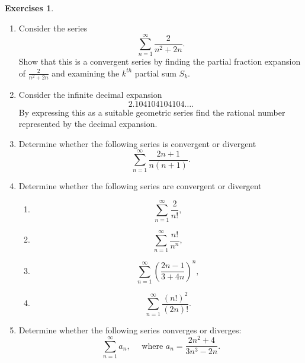 \documentclass[extrafontsizes, twoside, a4paper]{memoir}
\theoremstyle{plain}%
\theoremstyle{definition}
\newtheorem{exer}{Exercises}[chapter]
\theoremstyle{remark}
\newcommand{\postitemskip}{\vskip 0.2in}
\newcommand{\solution}[1]{}
\begin{document}
\begin{exer}
\begin{enumerate}
For the following definitions of $x_n$ determine whether the series $\sum_{n=1}^\infty x_n$ converges and if so find the sum of the series.
\begin{enumerate}
 \item
$x_n = \tfrac{2}{3} \left ( \tfrac{1}{2} \right )^n \tfrac{1}{4} \left ( \tfrac{2}{3} \right )^n$.
\item
$x_n =\left ( \tfrac{3}{2} \right )^{2n} \tfrac{1}{2} \left ( \tfrac{2}{3} \right )^{n+1}$
\end{enumerate}
\postitemskip
\item
 Consider the series
$$ \sum_{n=1}^\infty \dfrac{2}{n^2 + 2n} .$$
Show that this is a convergent series by finding the partial fraction expansion of $\tfrac{2}{n^2 + 2n}$ and examining the $k^{th}$ partial sum $S_k$.
\postitemskip
\item
 Consider the infinite decimal expansion
$$2.104104104104 \dots.$$
By expressing this as a suitable geometric series find the rational number represented by the decimal expansion.
\postitemskip
\item
Determine whether the following series is convergent or divergent
$$ \sum_{n=1}^\infty \frac{2n+1}{n(n+1)} .$$
\postitemskip
\item
Determine whether the following series are convergent or divergent
\begin{enumerate}
\item
$$ \sum_{n=1}^\infty \frac{2}{n!} ,$$
\item
$$ \sum_{n=1}^\infty \frac{n!}{n^n},$$
\item
$$ \sum_{n=1}^\infty \left ( \frac{2n-1}{3+4n} \right )^n ,$$
\item
$$ \sum_{n=1}^\infty \frac{(n!)^2}{(2n)!} .$$
\end{enumerate}
\postitemskip
\item
Determine whether the following series converges or diverges:
$$\sum_{n=1}^\infty a_n , \quad \mbox{ where } a_n =\frac{2n^2 + 4}{3n^3 -2n}.$$

\solution{Use standard comparison test. Observe that
$$\frac{2n^2 + 4}{3n^3 -2n} > \frac{2n^2}{3n^3}= \frac{2}{3}\frac{1}{n},$$
and hence $\sum a_n$ diverges as $\sum \frac{1}{n}$ is divergent.}


\end{enumerate}
\end{exer}
\end{document}
